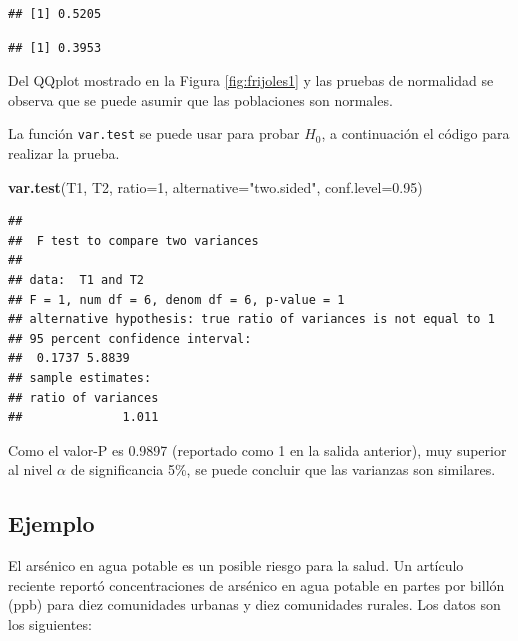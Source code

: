 \documentclass[10pt,]{krantz}
\makeatletter
\newenvironment{Shaded}{\begin{snugshade}}{\end{snugshade}}
\newcommand{\KeywordTok}[1]{\textcolor[rgb]{0.13,0.29,0.53}{\textbf{#1}}}
\newcommand{\DataTypeTok}[1]{\textcolor[rgb]{0.13,0.29,0.53}{#1}}
\newcommand{\DecValTok}[1]{\textcolor[rgb]{0.00,0.00,0.81}{#1}}
\newcommand{\FloatTok}[1]{\textcolor[rgb]{0.00,0.00,0.81}{#1}}
\newcommand{\StringTok}[1]{\textcolor[rgb]{0.31,0.60,0.02}{#1}}
\newcommand{\OperatorTok}[1]{\textcolor[rgb]{0.81,0.36,0.00}{\textbf{#1}}}
\newcommand{\NormalTok}[1]{#1}
\newenvironment{kframe}{%
\medskip{}
\setlength{\fboxsep}{.8em}
 \def\at@end@of@kframe{}%
 \ifinner\ifhmode%
  \def\at@end@of@kframe{\end{minipage}}%
  \begin{minipage}{\columnwidth}%
 \fi\fi%
 \def\FrameCommand##1{\hskip\@totalleftmargin \hskip-\fboxsep
 \colorbox{shadecolor}{##1}\hskip-\fboxsep
     \hskip-\linewidth \hskip-\@totalleftmargin \hskip\columnwidth}%
 \MakeFramed {\advance\hsize-\width
   \@totalleftmargin\z@ \linewidth\hsize
   \@setminipage}}%
 {\par\unskip\endMakeFramed%
 \at@end@of@kframe}
\renewenvironment{Shaded}{\begin{kframe}}{\end{kframe}}
\makeatother
\begin{document}
\begin{verbatim}
## [1] 0.5205
\end{verbatim}

\begin{Shaded}
\end{Shaded}

\begin{verbatim}
## [1] 0.3953
\end{verbatim}

Del QQplot mostrado en la Figura \ref{fig:frijoles1} y las pruebas de
normalidad se observa que se puede asumir que las poblaciones son
normales.

La función \texttt{var.test} se puede usar para probar \(H_0\), a
continuación el código para realizar la prueba.

\begin{Shaded}
\begin{Highlighting}[]
\KeywordTok{var.test}\NormalTok{(T1, T2, }\DataTypeTok{ratio=}\DecValTok{1}\NormalTok{, }\DataTypeTok{alternative=}\StringTok{"two.sided"}\NormalTok{,}
         \DataTypeTok{conf.level=}\FloatTok{0.95}\NormalTok{)}
\end{Highlighting}
\end{Shaded}

\begin{verbatim}
## 
##  F test to compare two variances
## 
## data:  T1 and T2
## F = 1, num df = 6, denom df = 6, p-value = 1
## alternative hypothesis: true ratio of variances is not equal to 1
## 95 percent confidence interval:
##  0.1737 5.8839
## sample estimates:
## ratio of variances 
##              1.011
\end{verbatim}

Como el valor-P es 0.9897 (reportado como 1 en la salida anterior), muy
superior al nivel \(\alpha\) de significancia 5\%, se puede concluir que
las varianzas son similares.

\subsection*{Ejemplo}\label{ejemplo-70}


El arsénico en agua potable es un posible riesgo para la salud. Un
artículo reciente reportó concentraciones de arsénico en agua potable en
partes por billón (ppb) para diez comunidades urbanas y diez comunidades
rurales. Los datos son los siguientes:
\end{document}
